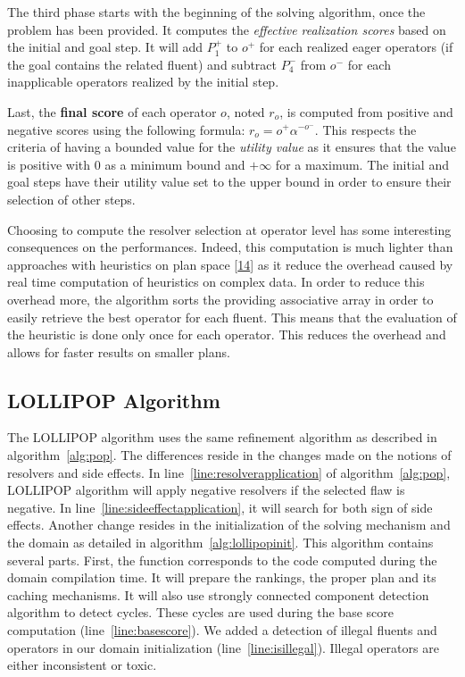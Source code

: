The third phase starts with the beginning of the solving algorithm, once
the problem has been provided. It computes the \emph{effective
realization scores} based on the initial and goal step. It will add
\(P_1^+\) to \(o^+\) for each realized eager operators (if the goal
contains the related fluent) and subtract \(P_4^-\) from \(o^-\) for
each inapplicable operators realized by the initial step.

Last, the \textbf{final score} of each operator \(o\), noted \(r_o\), is
computed from positive and negative scores using the following formula:
\(r_o = o^+ \alpha^{-o^-}\). This respects the criteria of having a
bounded value for the \emph{utility value} as it ensures that the value
is positive with \(0\) as a minimum bound and \(+\infty\) for a maximum.
The initial and goal steps have their utility value set to the upper
bound in order to ensure their selection of other steps.

Choosing to compute the resolver selection at operator level has some
interesting consequences on the performances. Indeed, this computation
is much lighter than approaches with heuristics on plan space
{[}\protect\hyperlink{ref-shekharux5flearningux5f2016}{14}{]} as it
reduce the overhead caused by real time computation of heuristics on
complex data. In order to reduce this overhead more, the algorithm sorts
the providing associative array in order to easily retrieve the best
operator for each fluent. This means that the evaluation of the
heuristic is done only once for each operator. This reduces the overhead
and allows for faster results on smaller plans.

\subsection{LOLLIPOP Algorithm}\label{sec:algorithm}

The LOLLIPOP algorithm uses the same refinement algorithm as described
in algorithm~\ref{alg:pop}. The differences reside in the changes made
on the notions of resolvers and side effects. In
line~\ref{line:resolverapplication} of algorithm~\ref{alg:pop}, LOLLIPOP
algorithm will apply negative resolvers if the selected flaw is
negative. In line~\ref{line:sideeffectapplication}, it will search for
both sign of side effects. Another change resides in the initialization
of the solving mechanism and the domain as detailed in
algorithm~\ref{alg:lollipopinit}. This algorithm contains several parts.
First, the  function corresponds to the code
computed during the domain compilation time. It will prepare the
rankings, the proper plan and its caching mechanisms. It will also use
strongly connected component detection algorithm to detect cycles. These
cycles are used during the base score computation
(line~\ref{line:basescore}). We added a detection of illegal fluents and
operators in our domain initialization (line~\ref{line:isillegal}).
Illegal operators are either inconsistent or toxic.

